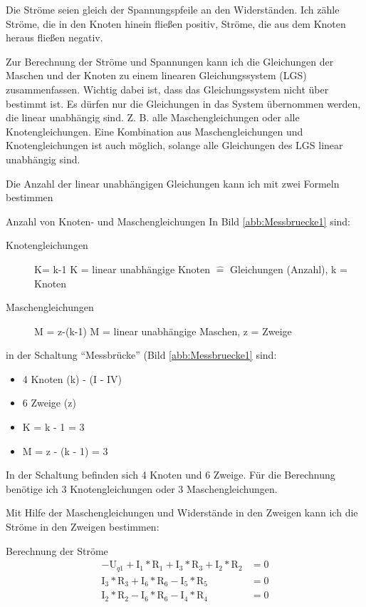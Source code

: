 \documentclass[aspectratio=169, ignorenonframetext]{beamer}
\begin{document}
Die Ströme seien gleich der Spannungspfeile an den Widerständen.
Ich zähle Ströme, die in den Knoten hinein fließen positiv, Ströme, die aus dem Knoten heraus fließen negativ.

Zur Berechnung der Ströme und Spannungen kann ich die Gleichungen der Maschen und der Knoten zu einem linearen Gleichungssystem (LGS) zusammenfassen. Wichtig dabei ist, dass das Gleichungssystem nicht über bestimmt ist. Es dürfen nur die Gleichungen in das System übernommen werden, die linear unabhängig sind. Z. B. alle Maschengleichungen oder alle Knotengleichungen. Eine Kombination aus Maschengleichungen und Knotengleichungen ist auch möglich, solange alle Gleichungen des LGS linear unabhängig sind.

Die Anzahl der linear unabhängigen Gleichungen kann ich mit zwei Formeln bestimmen

\begin{frame}{Anzahl von Knoten- und Maschengleichungen}
  In Bild \ref{abb:Messbruecke1} sind:
  \begin{description}
    \item[Knotengleichungen] K= k-1 K = linear unabhängige Knoten $\hat=$ Gleichungen (Anzahl), k = Knoten
    \item[Maschengleichungen]  M = z-(k-1) M = linear unabhängige Maschen, z = Zweige
\end{description}
in der Schaltung "`Messbrücke"' (Bild \ref{abb:Messbruecke1} sind:
\begin{itemize}
 \item 4 Knoten (k) - (I - IV)
 \item 6 Zweige (z)
 \item K = k - 1 = 3
 \item M = z - (k - 1) = 3
\end{itemize}

\end{frame}

In der Schaltung befinden sich 4 Knoten und 6 Zweige.
Für die Berechnung benötige ich 3 Knotengleichungen oder 3 Maschengleichungen.

Mit Hilfe der Maschengleichungen und Widerstände in den Zweigen kann ich die Ströme in den Zweigen bestimmen:

\begin{frame}{Berechnung der Ströme}
\begin{align}
  -\text{U}_{q1} + \text{I}_1 * \text{R}_1 + \text{I}_3 * \text{R}_3 + \text{I}_2 * \text{R}_2 &= 0\\
\text{I}_3 * \text{R}_3 + \text{I}_6 * \text{R}_6 - \text{I}_5 * \text{R}_5 &= 0 \\
\text{I}_2 * \text{R}_2 - \text{I}_6 * \text{R}_6 - \text{I}_4 * \text{R}_4 &= 0
\end{align}
\end{frame}
\end{document}
